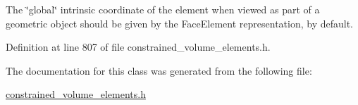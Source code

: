 The \char`\"{}global\char`\"{} intrinsic coordinate of the element when viewed as part of a geometric object should be given by the Face\+Element representation, by default. 



Definition at line 807 of file constrained\+\_\+volume\+\_\+elements.\+h.



The documentation for this class was generated from the following file\+:\begin{DoxyCompactItemize}
\item 
\hyperlink{constrained__volume__elements_8h}{constrained\+\_\+volume\+\_\+elements.\+h}\end{DoxyCompactItemize}
